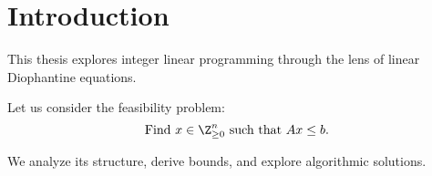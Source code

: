 \chapter{Introduction}

This thesis explores integer linear programming through the lens of linear Diophantine equations.

Let us consider the feasibility problem:
\[
\text{Find } x \in \Z_{\geq 0}^n \text{ such that } Ax \leq b.
\]

We analyze its structure, derive bounds, and explore algorithmic solutions.
